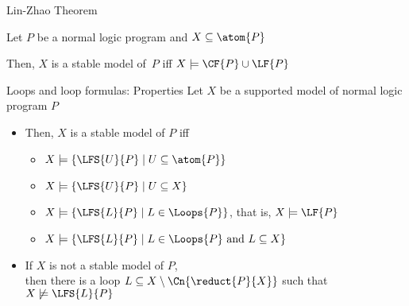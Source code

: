 \begin{frame}{Lin-Zhao Theorem}
\bigskip
\begin{theorem}
Let $P$ be a normal logic program and $X\subseteq\atom{P}$

Then, $X$ is a stable model of~$P$ iff $X\models\CF{P}\cup\LF{P}$
\end{theorem}
\end{frame}
\begin{frame}{Loops and loop formulas: Properties}
  \bigskip
  Let $X$ be a supported model of normal logic program $P$
  \medskip
  \begin{itemize}
  \item<2->  Then, $X$ is a stable model of $P$ iff
    \begin{itemize}
    \item $X\models\{  \LFS{U}{P} \mid U\subseteq\atom{P}  \}$
    \item $X\models\{  \LFS{U}{P} \mid U\subseteq X  \}$
    \item $X\models\{  \LFS{L}{P} \mid L\in\Loops{P}  \}$, that is, $X\models\LF{P}$
    \item $X\models\{  \LFS{L}{P} \mid L\in\Loops{P}\text{ and } L\subseteq X  \}$
    \end{itemize}
  \medskip
  \item<3-> 
    If $X$ is not a stable model of $P$,\\
    then there is a loop $L \subseteq X \setminus \Cn{\reduct{P}{X}}$
    such that $X \not\models \LFS{L}{P}$
  \end{itemize}
\end{frame}
